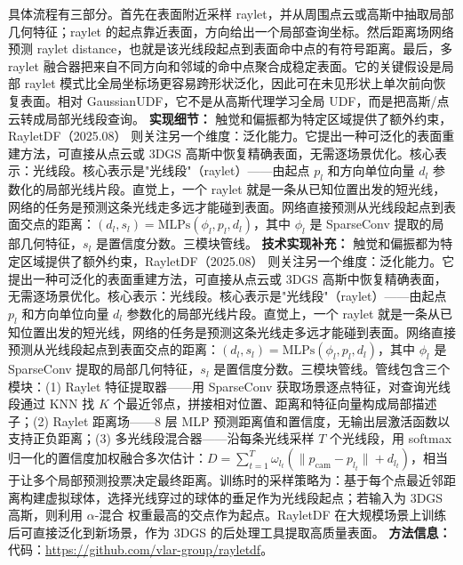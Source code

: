 具体流程有三部分。首先在表面附近采样 raylet，并从周围点云或高斯中抽取局部几何特征；raylet 的起点靠近表面，方向给出一个局部查询坐标。然后距离场网络预测 raylet distance，也就是该光线段起点到表面命中点的有符号距离。最后，多 raylet 融合器把来自不同方向和邻域的命中点聚合成稳定表面。它的关键假设是局部 raylet 模式比全局坐标场更容易跨形状泛化，因此可在未见形状上单次前向恢复表面。相对 GaussianUDF，它不是从高斯代理学习全局 UDF，而是把高斯/点云转成局部光线段查询。
\textbf{实现细节：} 触觉和偏振都为特定区域提供了额外约束，RayletDF（2025.08） 则关注另一个维度：泛化能力。它提出一种可泛化的表面重建方法，可直接从点云或 3DGS 高斯中恢复精确表面，无需逐场景优化。核心表示：光线段。核心表示是"光线段"（raylet）——由起点 $p_l$ 和方向单位向量 $d_l$ 参数化的局部光线片段。直觉上，一个 raylet 就是一条从已知位置出发的短光线，网络的任务是预测这条光线走多远才能碰到表面。网络直接预测从光线段起点到表面交点的距离：$(d_l, s_l) = \mathrm{MLPs}(\phi_l, p_l, d_l)$，其中 $\phi_l$ 是 SparseConv 提取的局部几何特征，$s_l$ 是置信度分数。三模块管线。
\textbf{技术实现补充：} 触觉和偏振都为特定区域提供了额外约束，RayletDF（2025.08） 则关注另一个维度：泛化能力。它提出一种可泛化的表面重建方法，可直接从点云或 3DGS 高斯中恢复精确表面，无需逐场景优化。核心表示：光线段。核心表示是"光线段"（raylet）——由起点 $p_l$ 和方向单位向量 $d_l$ 参数化的局部光线片段。直觉上，一个 raylet 就是一条从已知位置出发的短光线，网络的任务是预测这条光线走多远才能碰到表面。网络直接预测从光线段起点到表面交点的距离：$(d_l, s_l) = \mathrm{MLPs}(\phi_l, p_l, d_l)$，其中 $\phi_l$ 是 SparseConv 提取的局部几何特征，$s_l$ 是置信度分数。三模块管线。管线包含三个模块：(1) Raylet 特征提取器——用 SparseConv 获取场景逐点特征，对查询光线段通过 KNN 找 $K$ 个最近邻点，拼接相对位置、距离和特征向量构成局部描述子；(2) Raylet 距离场——8 层 MLP 预测距离值和置信度，无输出层激活函数以支持正负距离；(3) 多光线段混合器——沿每条光线采样 $T$ 个光线段，用 softmax 归一化的置信度加权融合多次估计：$D = \sum_{t=1}^{T}\omega_{l_t}(\|p_{\mathrm{cam}} - p_{l_t}\| + d_{l_t})$，相当于让多个局部预测投票决定最终距离。训练时的采样策略为：基于每个点最近邻距离构建虚拟球体，选择光线穿过的球体的垂足作为光线段起点；若输入为 3DGS 高斯，则利用 $\alpha$-混合 权重最高的交点作为起点。RayletDF 在大规模场景上训练后可直接泛化到新场景，作为 3DGS 的后处理工具提取高质量表面。
\textbf{方法信息：} 代码：\url{https://github.com/vlar-group/rayletdf}。
